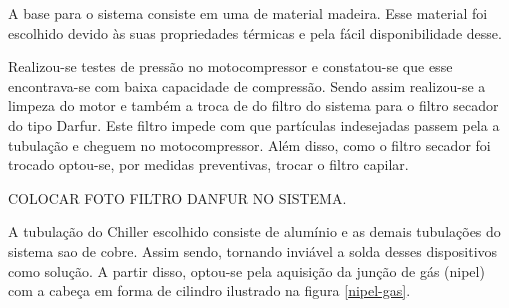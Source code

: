                         A base para o sistema consiste em uma de material madeira. Esse material foi
                        escolhido devido às suas propriedades térmicas e pela fácil disponibilidade desse. 
                        
                        Realizou-se testes de pressão no motocompressor e constatou-se que esse encontrava-se
                        com baixa capacidade de compressão. Sendo assim realizou-se a limpeza do motor e
                        também a troca de do filtro do sistema para o filtro secador do tipo Darfur.
                        Este filtro impede com que partículas indesejadas passem pela a tubulação e cheguem
                        no motocompressor. Além disso, como o filtro secador foi trocado optou-se, por medidas
                        preventivas, trocar o filtro capilar. 

                        COLOCAR FOTO FILTRO DANFUR NO SISTEMA. 

                        A tubulação do Chiller escolhido consiste de alumínio e as demais tubulações do
                        sistema sao de cobre. Assim sendo, tornando inviável a solda desses dispositivos como
                        solução. A partir disso, optou-se pela aquisição da junção de gás (nipel)
                        com a cabeça em forma de cilindro ilustrado na figura \ref{nipel-gas}.
                        
